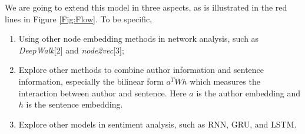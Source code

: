 We are going to extend this model in three aspects, as is illustrated in the red lines in Figure \ref{Fig:Flow}. To be specific, 
\begin{enumerate}   [(1)]
\item Using other node embedding methods in network analysis, such as \textit{DeepWalk}[2] and \textit{node2vec}[3];
\item Explore other methods to combine author information and sentence information, especially the bilinear form $a^T W h$ which measures the interaction between author and sentence. Here $a$ is the author embedding and $h$ is the sentence embedding.
\item Explore other models in sentiment analysis, such as RNN, GRU, and LSTM.
\end{enumerate}
